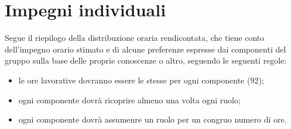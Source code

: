 


\section{Impegni individuali}
 Segue il riepilogo della distribuzione oraria rendicontata, che tiene conto dell'impegno orario stimato e di alcune preferenze espresse dai componenti del gruppo sulla base delle proprie conoscenze o altro, seguendo le seguenti regole:
    \begin{itemize}
        \item le ore lavorative dovranno essere le stesse per ogni componente (92);
        \item ogni componente dovrà ricoprire almeno una volta ogni ruolo;
        \item ogni componente dovrà assumenre un ruolo per un congruo numero di ore.
        
    \end{itemize}

